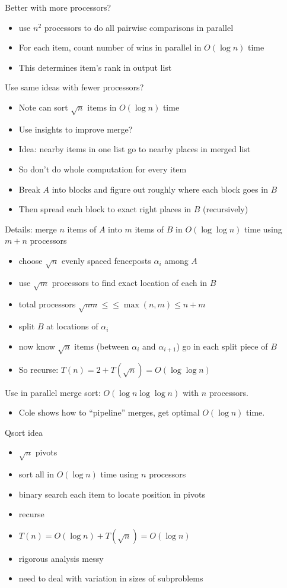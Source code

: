 \documentclass[12pt]{article}
\begin{document}
Better with more processors?
\begin{itemize}
\item use $n^2$ processors to do all pairwise comparisons in parallel 
\item For each item, count number of wins in parallel in $O(\log n)$
  time
\item This determines item's rank in output list
\end{itemize}

Use same ideas with fewer processors?
\begin{itemize}
\item Note can sort $\sqrt{n}$ items in $O(\log n)$ time
\item Use insights to improve merge?
\item Idea: nearby items in one list go to nearby places in merged list
\item So don't do whole computation for every item
\item Break $A$ into blocks and figure out roughly where each block
  goes in $B$
\item Then spread each block to exact right places in $B$ (recursively)
\end{itemize}

Details: merge $n$ items of $A$ into $m$ items of $B$ in $O(\log\log n)$
  time using $m+n$ processors
\begin{itemize}
\item choose $\sqrt{n}$ evenly spaced fenceposts
  $\alpha_i$ among $A$
\item use $\sqrt{m}$ processors to find exact location of each in $B$
\item total processors $\sqrt{nm}\le \le \max(n,m) \le n+m$ 
\item split $B$ at locations of $\alpha_i$
\item now know $\sqrt{n}$ items (between $\alpha_i$ and $\alpha_{i+1}$)
  go in each split piece of $B$
\item So recurse: $T(n)=2+T(\sqrt{n})=O(\log\log n)$
\end{itemize}

Use in parallel merge sort: $O(\log n \log\log n)$ with $n$
processors.
\begin{itemize}
\item Cole shows how to ``pipeline'' merges, get optimal $O(\log n)$ time.
\end{itemize}

Qsort idea
\begin{itemize}
\item $\sqrt{n}$ pivots
\item sort all in $O(\log n)$ time using $n$ processors
\item binary search each item to locate position in pivots
\item recurse
\item $T(n) = O(\log n) + T(\sqrt{n}) = O(\log n)$
\item rigorous analysis messy
\item need to deal with variation in sizes of subproblems
\end{itemize}
\end{document}
